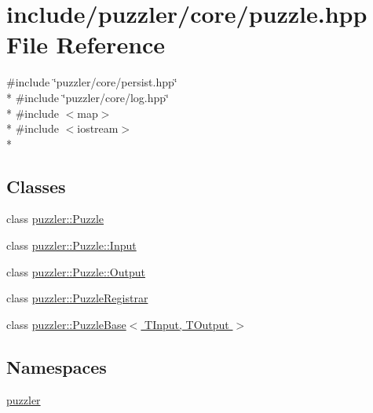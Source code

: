 \hypertarget{a00122}{}\section{include/puzzler/core/puzzle.hpp File Reference}
\label{a00122}
{\ttfamily \#include \char`\"{}puzzler/core/persist.\+hpp\char`\"{}}\\*
{\ttfamily \#include \char`\"{}puzzler/core/log.\+hpp\char`\"{}}\\*
{\ttfamily \#include $<$map$>$}\\*
{\ttfamily \#include $<$iostream$>$}\\*
\subsection*{Classes}
\begin{DoxyCompactItemize}
\item 
class \hyperlink{a00026}{puzzler\+::\+Puzzle}
\item 
class \hyperlink{a00009}{puzzler\+::\+Puzzle\+::\+Input}
\item 
class \hyperlink{a00023}{puzzler\+::\+Puzzle\+::\+Output}
\item 
class \hyperlink{a00028}{puzzler\+::\+Puzzle\+Registrar}
\item 
class \hyperlink{a00027}{puzzler\+::\+Puzzle\+Base$<$ T\+Input, T\+Output $>$}
\end{DoxyCompactItemize}
\subsection*{Namespaces}
\begin{DoxyCompactItemize}
\item 
 \hyperlink{a00145}{puzzler}
\end{DoxyCompactItemize}
